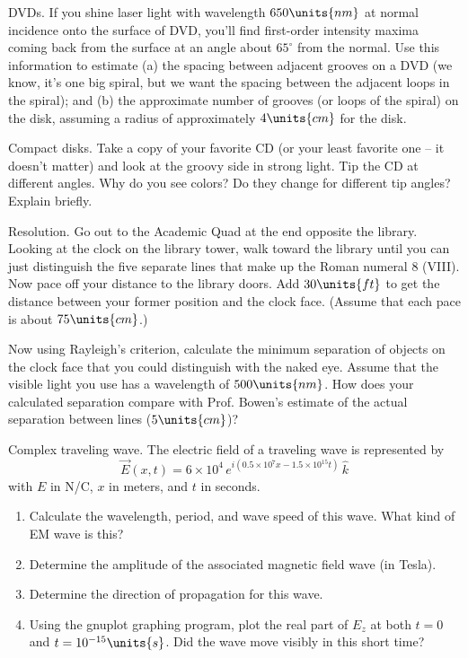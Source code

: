 \begin{aproblem}{DVDs.}  
  If you shine laser light with wavelength $650\units{nm}$ at normal
  incidence onto the surface of DVD, you'll find first-order intensity
  maxima coming back from the surface at an angle about $65^{\circ}$
  from the normal.  Use this information to estimate (a) the spacing
  between adjacent grooves on a DVD (we know, it's one big spiral, but
  we want the spacing between the adjacent loops in the spiral); and
  (b) the approximate number of grooves (or loops of the spiral) on
  the disk, assuming a radius of approximately $4\units{cm}$ for the
  disk.
  \label{prob:dvds}
\end{aproblem}


\begin{aproblem}{Compact disks.} 
  Take a copy of your favorite CD (or your least favorite one -- it
  doesn't matter) and look at the groovy side in strong light. Tip the
  CD at different angles. Why do you see colors?  Do they change for
  different tip angles? Explain briefly.
\end{aproblem}

\newpage

\begin{aproblem}{Resolution.} 
  Go out to the Academic Quad at the end opposite the library. Looking
  at the clock on the library tower, walk toward the library until you
  can just distinguish the five separate lines that make up the Roman
  numeral 8 (VIII).  Now pace off your distance to the library doors.
  Add $30\units{ft}$ to get the distance between your former position
  and the clock face.  (Assume that each pace is about
  $75\units{cm}$.)

  Now using Rayleigh's criterion, calculate the minimum separation of
  objects on the clock face that you could distinguish with the naked
  eye.  Assume that the visible light you use has a wavelength of
  $500\units{nm}$.  How does your calculated separation compare with
  Prof.  Bowen's estimate of the actual separation between lines
  ($5\units{cm}$)?
\end{aproblem}


\begin{aproblem}{Complex traveling wave.} 
  The electric field of a traveling wave is represented by
  \[
  \vec E(x,t) = 6\times 10^4\, e^{i(0.5\times 10^7 x - 1.5\times
    10^{15}t)}\,\hat k
  \]
  with $E$ in N/C, $x$ in meters, and $t$ in seconds.
  \begin{enumerate}
  \item Calculate the wavelength, period, and wave speed of this wave.
    What kind of EM wave is this?
  \item Determine the amplitude of the associated magnetic field wave
    (in Tesla).
  \item Determine the direction of propagation for this wave.
  \item Using the gnuplot graphing program, plot the real part of
    $E_z$ at both $t=0$ and $t=10^{-15}\units{s}$.  Did the wave move
    visibly in this short time?
  \end{enumerate}
  \label{prob:complex_traveling_wave}
\end{aproblem}


